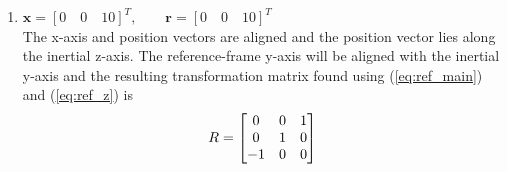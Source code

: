 \documentclass[11pt,fleqn]{report}
\begin{document}
\begin{enumerate}
\item $\textbf{x} = [0 \quad 0 \quad 10]^T, \qquad
 \textbf{r} = [0 \quad 0 \quad 10]^T$ \\
 The x-axis and position vectors are aligned and the position vector
 lies along the inertial z-axis. The reference-frame y-axis will be
 aligned with the inertial y-axis and the resulting transformation
 matrix found using (\ref{eq:ref_main}) and (\ref{eq:ref_z}) is
 \begin{equation*}
\hfill R = \begin{bmatrix} 0 & 0 & 1 \\
 0 & 1 & 0 \\
 -1 & 0 & 0
 \end{bmatrix} \hfill
 \end{equation*}
\end{enumerate}
\end{document}
